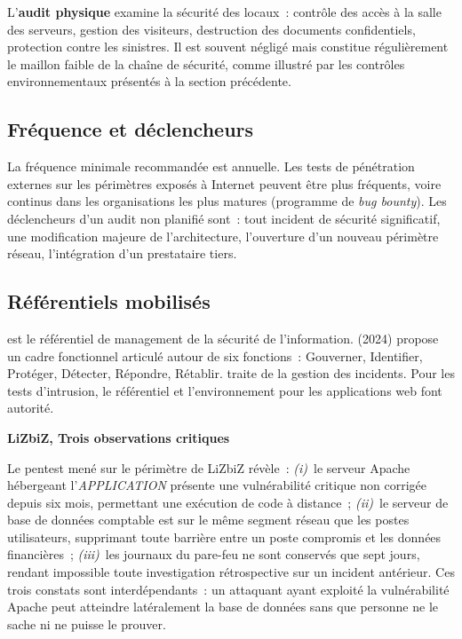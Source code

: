 L'\textbf{audit physique} examine la sécurité des locaux~: contrôle des accès à la
salle des serveurs, gestion des visiteurs, destruction des documents confidentiels,
protection contre les sinistres. Il est souvent négligé mais constitue régulièrement
le maillon faible de la chaîne de sécurité, comme illustré par les contrôles
environnementaux présentés à la section précédente.

\subsection{Fréquence et déclencheurs}

La fréquence minimale recommandée est annuelle. Les tests de pénétration externes
sur les périmètres exposés à Internet peuvent être plus fréquents, voire continus
dans les organisations les plus matures (programme de \textit{bug bounty}). Les
déclencheurs d'un audit non planifié sont~: tout incident de sécurité significatif,
une modification majeure de l'architecture, l'ouverture d'un nouveau périmètre
réseau, l'intégration d'un prestataire tiers.

\subsection{Référentiels mobilisés}

 est le référentiel de management de la sécurité de
l'information.  (2024) propose un cadre
fonctionnel articulé autour de six fonctions~: Gouverner, Identifier, Protéger,
Détecter, Répondre, Rétablir.  traite de la gestion des
incidents. Pour les tests d'intrusion, le référentiel  et
l'environnement  pour les applications web font autorité.

\begin{boxlizbiz}
\textbf{LiZbiZ, Trois observations critiques}

Le pentest mené sur le périmètre de LiZbiZ révèle~: \textit{(i)}~le serveur Apache
hébergeant l'\textit{APPLICATION} présente une vulnérabilité critique non corrigée
depuis six mois, permettant une exécution de code à distance~; \textit{(ii)}~le
serveur de base de données comptable est sur le même segment réseau que les postes
utilisateurs, supprimant toute barrière entre un poste compromis et les données
financières~; \textit{(iii)}~les journaux du pare-feu ne sont conservés que sept jours,
rendant impossible toute investigation rétrospective sur un incident antérieur.
Ces trois constats sont interdépendants~: un attaquant ayant exploité la vulnérabilité
Apache peut atteindre latéralement la base de données sans que personne ne le sache
ni ne puisse le prouver.
\end{boxlizbiz}


